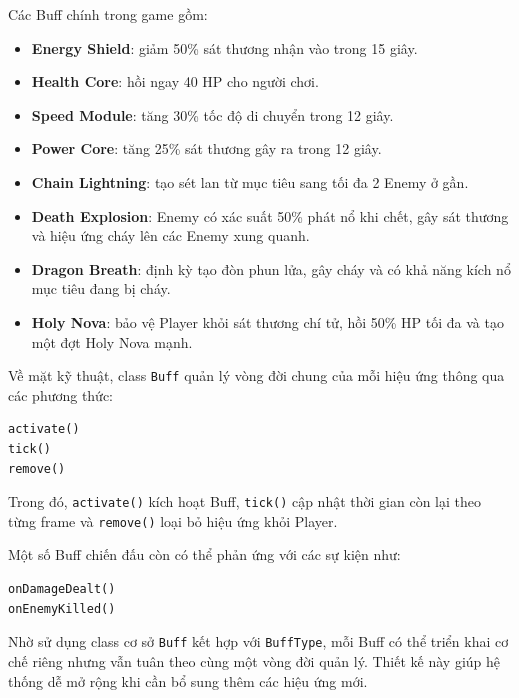 \documentclass[12pt,a4paper]{report}
\begin{document}
    Các Buff chính trong game gồm:

    \begin{itemize}
        \item \textbf{Energy Shield}: giảm 50\% sát thương nhận vào
        trong 15 giây.

        \item \textbf{Health Core}: hồi ngay 40 HP cho người chơi.

        \item \textbf{Speed Module}: tăng 30\% tốc độ di chuyển
        trong 12 giây.

        \item \textbf{Power Core}: tăng 25\% sát thương gây ra
        trong 12 giây.

        \item \textbf{Chain Lightning}: tạo sét lan từ mục tiêu
        sang tối đa 2 Enemy ở gần.

        \item \textbf{Death Explosion}: Enemy có xác suất 50\%
        phát nổ khi chết, gây sát thương và hiệu ứng cháy
        lên các Enemy xung quanh.

        \item \textbf{Dragon Breath}: định kỳ tạo đòn phun lửa,
        gây cháy và có khả năng kích nổ mục tiêu đang bị cháy.

        \item \textbf{Holy Nova}: bảo vệ Player khỏi sát thương chí tử,
        hồi 50\% HP tối đa và tạo một đợt Holy Nova mạnh.
    \end{itemize}

    Về mặt kỹ thuật, class \texttt{Buff} quản lý vòng đời chung của
    mỗi hiệu ứng thông qua các phương thức:

    \begin{verbatim}
activate()
tick()
remove()
    \end{verbatim}

    Trong đó, \texttt{activate()} kích hoạt Buff, \texttt{tick()}
    cập nhật thời gian còn lại theo từng frame và \texttt{remove()}
    loại bỏ hiệu ứng khỏi Player.

    Một số Buff chiến đấu còn có thể phản ứng với các sự kiện như:

    \begin{verbatim}
onDamageDealt()
onEnemyKilled()
    \end{verbatim}

    Nhờ sử dụng class cơ sở \texttt{Buff} kết hợp với
    \texttt{BuffType}, mỗi Buff có thể triển khai cơ chế riêng nhưng
    vẫn tuân theo cùng một vòng đời quản lý. Thiết kế này giúp hệ thống
    dễ mở rộng khi cần bổ sung thêm các hiệu ứng mới.
\end{document}
